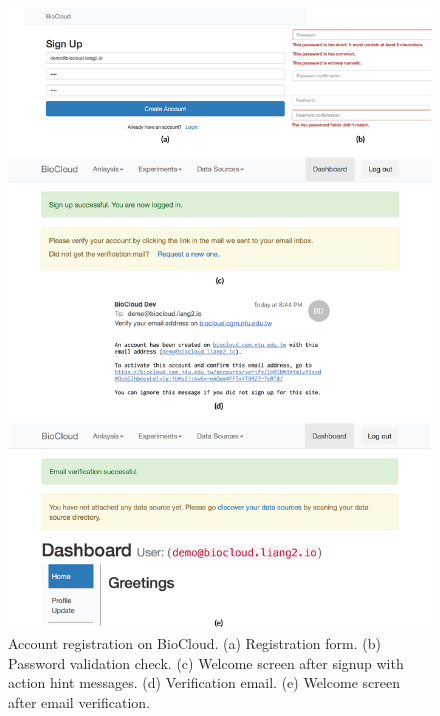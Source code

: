 \begin{figure}[!p]
\centering
\includegraphics[width=1\textwidth]{images/biocloud_signup}
\caption[Account registration on BioCloud]{
    Account registration on BioCloud.
    (a) Registration form.
    (b) Password validation check.
    (c) Welcome screen after signup with action hint messages.
    (d) Verification email.
    (e) Welcome screen after email verification.
}
\label{fig:biocloud-signup}
\end{figure}
